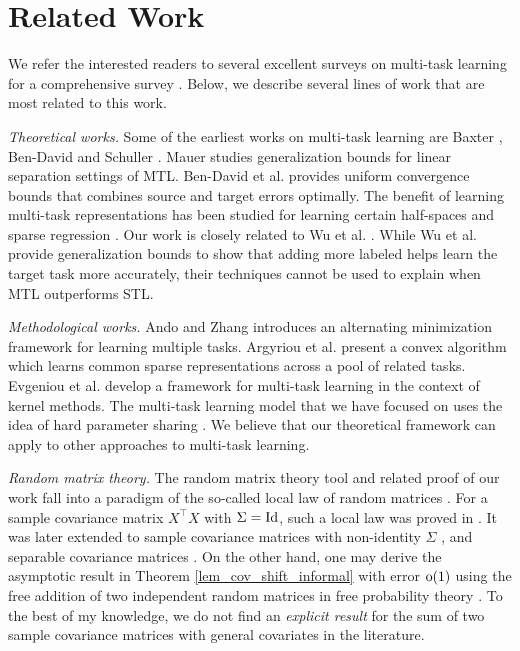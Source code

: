 \vspace{-0.05in}
\section{Related Work}
\vspace{-0.05in}

We refer the interested readers to several excellent surveys on multi-task  learning for a comprehensive survey \cite{PY09,R17,ZY17,V20}.
Below, we describe several lines of work that are most related to this work.

\textit{Theoretical works.}
Some of the earliest works on multi-task learning are Baxter \cite{B00}, Ben-David and Schuller \cite{BS03}.
Mauer \cite{M06} studies generalization bounds for linear separation settings of MTL.
Ben-David et al. \cite{BBCK10} provides uniform convergence bounds that combines source and target errors optimally.
The benefit of learning multi-task representations has been studied for learning certain half-spaces \cite{MPR16} and sparse regression \cite{LPTV09,LPVT11}.
Our work is closely related to Wu et al. \cite{WZR20}.
While Wu et al. provide generalization bounds to show that adding more labeled helps learn the target task more accurately, their techniques cannot be used to explain when MTL outperforms STL.

\textit{Methodological works.}
Ando and Zhang \cite{AZ05} introduces an alternating minimization framework for learning multiple tasks.
Argyriou et al. \cite{AEP08} present a convex algorithm which learns common sparse representations across a pool of related tasks.
Evgeniou et al. \cite{EMP05} develop a framework for multi-task learning in the context of kernel methods.
The multi-task learning model that we have focused on uses the idea of hard parameter sharing \cite{C93,KD12,R17}.
We believe that our theoretical framework can apply to other approaches to multi-task learning.

\textit{Random matrix theory.}
The random matrix theory tool and related proof of our work fall into a paradigm of the so-called local law of random matrices \cite{erdos2017dynamical}.
For a sample covariance matrix $X^\top X$ with $\Sigma=\operatorname{Id}$, such a local law was proved in \cite{isotropic}.
It was later extended to sample covariance matrices with non-identity $\Sigma$ \cite{Anisotropic}, and separable covariance matrices \cite{yang2019spiked}. On the other hand, one may derive the asymptotic result in Theorem \ref{lem_cov_shift_informal} with error $\operatorname{o}(1)$ using the free addition of two independent random matrices in free probability theory \cite{nica2006lectures}. To the best of my knowledge, we do not find an {\it explicit result} for the sum of two sample covariance matrices with general covariates in the literature.


